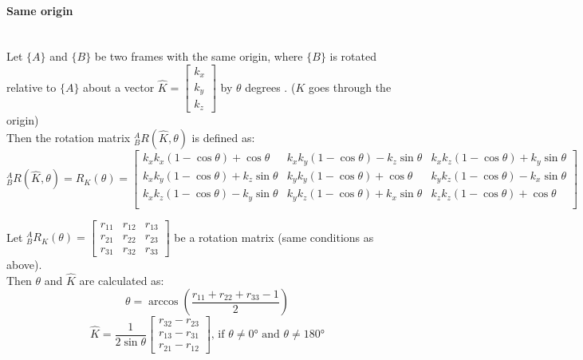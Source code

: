 \documentclass[10pt,a4paper]{article}
\newcommand{\vect}[1]{\ensuremath{\begin{bmatrix}#1\end{bmatrix}}}
\begin{document}
\paragraph{Same origin} ~\\
Let $\{A\}$ and $\{B\}$ be two frames with the same origin, where $\{B\}$ is rotated relative to $\{A\}$ about a vector $\hat{K} = \vect{k_x \\ k_y \\ k_z}$ by $\theta$ degrees . ($K$ goes through the origin) \\
Then the rotation matrix $^A_BR(\hat{K},\theta)$ is defined as: \\
$$
	^A_BR(\hat{K}, \theta) = R_K(\theta) = \begin{bmatrix}
		k_xk_x (1 - \cos \theta) + \cos \theta & k_xk_y(1 - \cos \theta) - k_z \sin \theta & k_xk_z(1 - \cos \theta) + k_y \sin \theta \\
		k_xk_y (1 - \cos \theta) + k_z \sin \theta & k_yk_y(1 - \cos \theta) + \cos \theta & k_yk_z(1 - \cos \theta) - k_x \sin \theta \\
		k_xk_z (1 - \cos \theta) - k_y \sin \theta & k_yk_z(1 - \cos \theta) + k_x \sin \theta & k_zk_z(1 - \cos \theta) + \cos \theta \\		
	\end{bmatrix}
$$

Let $^A_BR_K(\theta) = \vect{r_{11} & r_{12} & r_{13} \\ r_{21} & r_{22} & r_{23} \\ r_{31} & r_{32} & r_{33}}$ be a rotation matrix (same conditions as above). \\
Then $\theta$ and $\hat{K}$ are calculated as:
$$
	\theta = \arccos \left(\frac{r_{11} + r_{22} + r_{33} - 1}{2}\right)
$$
$$	
	\hat{K} = \frac {1}{2 \sin \theta} \vect{r_{32} - r_{23} \\ r_{13} - r_{31} \\ r_{21} - r_{12}} \text{, if } \theta ≠ 0° \text{ and } \theta ≠ 180°
$$
\end{document}
